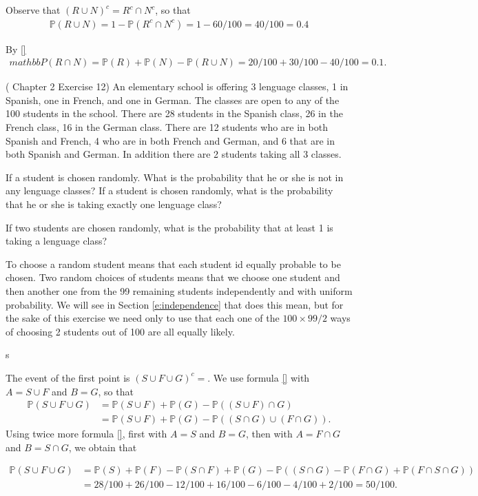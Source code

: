 \documentclass[12pt]{article}
\newcommand{\<}{{\langle \!\! \langle}}
\renewcommand{\>}{{\rangle \!\! \rangle}}
\newcommand{\bel}[2]{\begin{equation} \label{#1} \begin{split} #2
 					\end{split} \end{equation}}
\newcommand{\commento}[1]{
	\par\noindent
	\colorbox{light}{\begin{minipage}{120 mm}#1\end{minipage}}
	\par\noindent
}
\begin{document}
\begin{ExerciseList}
		\Question Observe that $(R\cup N)^c = R^c \cap N^c $, so that 
		\bel{}{\mathbb{P}(R \cup N) = 1-\mathbb{P}(R^c\cap N^c) = 1-60/100=40/100=0.4}
		
	\Question By \eqref{} 
	\bel{}{mathbb{P}(R \cap N) = \mathbb{P}(R)+\mathbb{P}(N)-\mathbb{P}(R\cup N)=20/100+30/100-40/100=0.1.}


		\Exercise (\cite{Ross} Chapter 2 Exercise 12) An elementary school is offering 3 lenguage classes, 1 in Spanish, one in French, and one in German. The classes are open to any of the 100 students in the school. There are 28 students in the Spanish class, 26 in the French class, 16 in the German class. There are 12 students who are in both Spanish and French, 4 who are in both French and German, and 6 that are in both Spanish and German. In addition there are 2 students taking all 3 classes.

\Question If a student is chosen randomly. What is the probability that he or she is not in any lenguage classes?
	\Question If a student is chosen randomly, what is the probability that he or she is taking exactly one lenguage class?

	\Question If two students are chosen randomly, what is the probability that at least 1 is taking a lenguage class? 
\commento{To choose a random student means that each student id equally probable to be chosen. Two random choices of students means that we choose one student and then another one from the 99 remaining students independently and with uniform probability. We will see in Section \ref{e:independence}  that does this mean, but for the sake of this exercise we need only to use that each one of the $ 100\times 99/2 $ ways of choosing 2 students out of 100 are all equally likely.}


\Answer s

	\Question The event of the first point is $(S \cup F \cup G)^c=$. We use formula \eqref{} with $A=S \cup F$ and $B=G$, so that 
	\bel{}{\mathbb{P}(S \cup F \cup G) & = \mathbb{P}(S \cup F) + \mathbb{P}(G)-\mathbb{P}((S \cup F)\cap G) \\
	& = \mathbb{P}(S \cup F) + \mathbb{P}( G)- \mathbb{P}((S\cap G)\cup (F \cap G)). }
	Using twice more formula \eqref{}, first with $A=S$ and $B=G$, then with $A= F \cap G$ and $B = S\cap G$, we obtain that

	\bel{}{\mathbb{P}(S \cup F \cup G) & = \mathbb{P}(S) + \mathbb{P}(F) -\mathbb{P}(S \cap F) + \mathbb{P}(G)-\mathbb{P}((S \cap G)-\mathbb{P}(F \cap G) + \mathbb{P}(F \cap S \cap G) ) \\
	& = 28/100 + 26/100 - 12/100 + 16/100 - 6/100 -4/100 + 2/100 = 50/100.
	}
  

\end{ExerciseList}
\end{document}
